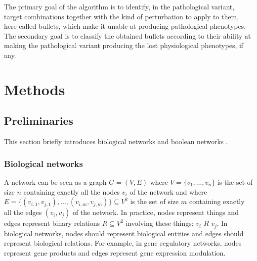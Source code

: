 \documentclass[oneside,a4paper,onecolumn,notitlepage]{article}
\begin{document}
The primary goal of the algorithm is to identify, in the pathological variant, target combinations together with the kind of perturbation to apply to them, here called bullets, which make it unable at producing pathological phenotypes. The secondary goal is to classify the obtained bullets according to their ability at making the pathological variant producing the lost physiological phenotypes, if any.

\section{Methods}
\subsection{Preliminaries}
This section briefly introduces biological networks \cite{zhu2007getting} and boolean networks \cite{saadatpour2012boolean}.

\subsubsection{Biological networks}
A network can be seen as a graph $G=(V,E)$ where $V=\lbrace v_1,\dots,v_n\rbrace$ is the set of size $n$ containing exactly all the nodes $v_i$ of the network and where $E=\lbrace (v_{i,1},v_{j,1}),\dots,(v_{i,m},v_{j,m})\rbrace \subseteq V^2$ is the set of size $m$ containing exactly all the edges $(v_{i},v_{j})$ of the network. In practice, nodes represent things and edges represent binary relations $R\subseteq V^2$ involving these things: $v_{i}$ $R$ $v_{j}$. In biological networks, nodes should represent biological entities and edges should represent biological relations. For example, in gene regulatory networks, nodes represent gene products and edges represent gene expression modulation.
\end{document}
